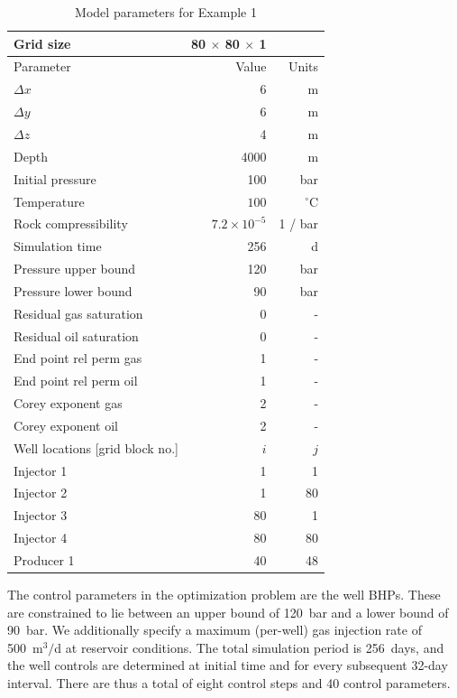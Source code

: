 \documentclass[twocolumn,numbook]{svjour3}          %
\begin{document}
%
\begin{table}
\centering
\caption{Model parameters for Example 1}
\begin{tabular}{|l|rr|}
\hline
Grid size                & 80 $\times$ 80 $\times$ 1 &       \\
\hline\hline
Parameter                & Value    & Units \\
\hline
$\Delta x$               & 6 &m          \\
$\Delta y$               & 6 &m          \\
$\Delta z$               & 4&m         \\
Depth                    & 4000&m           \\
Initial pressure         & 100  & bar        \\
Temperature              &$100$ & $^\circ$C     \\
\hline
Rock compressibility     & $7.2 \times 10^{-5}$ & 1 / bar \\
Simulation time          &256 & d          \\
Pressure upper bound     & 120 & bar        \\
Pressure lower bound     &  90 & bar        \\
\hline
Residual gas saturation  & 0 & -            \\
Residual oil saturation  & 0 & -            \\
End point rel perm gas   & 1 & -            \\
End point rel perm oil   & 1 & -            \\
Corey exponent gas       & 2 & -            \\
Corey exponent oil       & 2 & -            \\
\hline\hline
Well locations [grid block no.] & $i$ & $j$     \\
\hline
Injector 1               &   1&  1   \\
Injector 2               &   1& 80   \\
Injector 3               &  80&  1   \\
Injector 4               &  80& 80   \\
Producer 1               &  40& 48   \\
\hline
\end{tabular}
\label{table:PI}
\end{table}
%


The control parameters in the optimization problem are the well BHPs. These are constrained to lie between an
upper bound of 120~bar and a lower bound of 90~bar. We additionally specify a
maximum (per-well) gas injection rate of 500~m$^3/$d at reservoir conditions.
The total simulation period is 256~days, and the well controls are determined
at initial time and for every subsequent 32-day interval. There are thus a
total of eight control steps and 40 control parameters.
\end{document}
